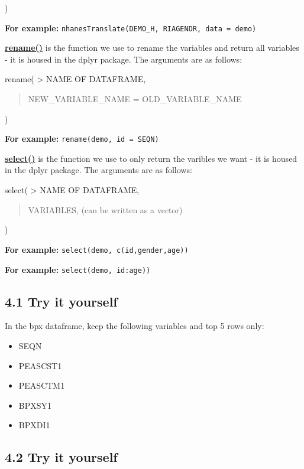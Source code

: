 \documentclass[
]{book}
\providecommand{\tightlist}{%
  \setlength{\itemsep}{0pt}\setlength{\parskip}{0pt}}
\begin{document}
)

\textbf{For example:} \texttt{nhanesTranslate(\textquotesingle{}DEMO\_H\textquotesingle{},\ RIAGENDR,\ data\ =\ demo)}

\href{https://www.rdocumentation.org/packages/dplyr/versions/0.7.8/topics/select}{\textbf{rename()}} is the function we use to rename the variables and return all variables - it is housed in the dplyr package. The arguments are as follows:

rename(
\textgreater{} NAME OF DATAFRAME,

\begin{quote}
NEW\_VARIABLE\_NAME = OLD\_VARIABLE\_NAME
\end{quote}

)

\textbf{For example:} \texttt{rename(demo,\ id\ =\ SEQN)}

\href{https://www.rdocumentation.org/packages/dplyr/versions/0.7.8/topics/select}{\textbf{select()}} is the function we use to only return the varibles we want - it is housed in the dplyr package. The arguments are as follows:

select(
\textgreater{} NAME OF DATAFRAME,

\begin{quote}
VARIABLES, (can be written as a vector)
\end{quote}

)

\textbf{For example:} \texttt{select(demo,\ c(id,gender,age))}

\textbf{For example:} \texttt{select(demo,\ id:age))}

\hypertarget{try-it-yourself-14}{%
\subsection{4.1 Try it yourself}\label{try-it-yourself-14}}

In the bpx dataframe, keep the following variables and top 5 rows only:

\begin{itemize}
\tightlist
\item
  SEQN
\item
  PEASCST1
\item
  PEASCTM1
\item
  BPXSY1
\item
  BPXDI1
\end{itemize}

\hypertarget{try-it-yourself-15}{%
\subsection{4.2 Try it yourself}\label{try-it-yourself-15}}
\end{document}
